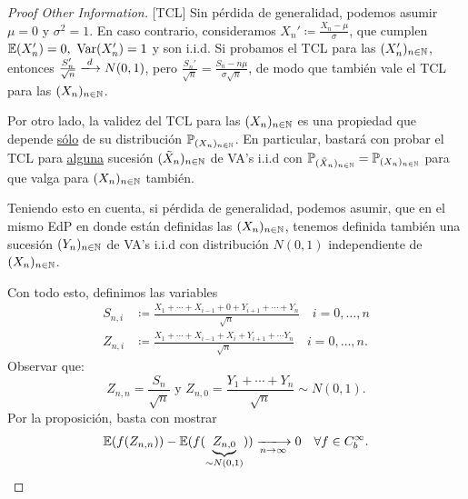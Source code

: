 \begin{proof}[Proof Other Information][TCL]
	Sin pérdida de generalidad, podemos asumir $\mu = 0$ y $\sigma^{2} = 1$. En caso contrario, consideramos $X_{n}' \coloneq \frac{X_{n} - \mu}{\sigma}$, que cumplen $\mbb{E}(X_{n}') = 0,\ \Var(X_{n}') = 1$ y son i.i.d. Si probamos el TCL para las $(X_{n}')_{n \in \mathbb{N}}$, entonces $\frac{S_{n}'}{\sqrt{n}} \xlongrightarrow{d} N(0,1)$, pero $\frac{S_{n}'}{\sqrt{n}} = \frac{S_{n} - n\mu}{\sigma \sqrt{n}}$, de modo que también vale el TCL para las $(X_{n})_{n \in \mathbb{N}}$. \par
	Por otro lado, la validez del TCL para las $(X_{n})_{n \in \mathbb{N}}$ es una propiedad que depende \underline{sólo} de su distribución $\mathbb{P}_{(X_{n})_{n \in \mathbb{N}}}$. En particular, bastará con probar el TCL para \underline{alguna} sucesión $(\tilde{X}_{n})_{n \in \mathbb{N}}$ de VA's i.i.d con $\mathbb{P}_{(\tilde{X}_{n})_{n \in \mathbb{N}}} = \mathbb{P}_{(X_{n})_{n \in \mathbb{N}}}$ para que valga para $(X_{n})_{n \in \mathbb{N}}$ también. \par
	Teniendo esto en cuenta, si pérdida de generalidad, podemos asumir, que en el mismo EdP en donde están definidas las $(X_{n})_{n \in \mathbb{N}}$, tenemos definida también una sucesión $(Y_{n})_{n \in \mathbb{N}}$ de VA's i.i.d con distribución $N(0,1)$ independiente de $(X_{n})_{n \in \mathbb{N}}$. \par
	Con todo esto, definimos las variables
	\begin{align*}
		S_{n, i} &\coloneq \frac{X_{1} + \cdots + X_{i - 1} + 0 + Y_{i + 1} + \cdots + Y_{n}}{\sqrt{n}} \quad i = 0,\dots,n \\
		Z_{n, i} &\coloneq \frac{X_{1} + \cdots + X_{i - 1} + X_{i} + Y_{i + 1} + \cdots Y_{n}}{\sqrt{n}} \quad i = 0,\dots,n
	.\end{align*}
	Observar que:
	\[ Z_{n,n} = \frac{S_{n}}{\sqrt{n}} \text{ y } Z_{n,0} = \frac{Y_{1} + \cdots + Y_{n}}{\sqrt{n}} \sim N(0,1). \]
	Por la proposición, basta con mostrar
	\[ \mbb{E}(f(Z_{n,n})) - \mbb{E}(f(\underbrace{Z_{n,0}}_{\sim N(0,1)})) \xlongrightarrow[n \to \infty]{} 0 \quad \forall f \in C_{b}^{\infty}. \]
\end{proof}
